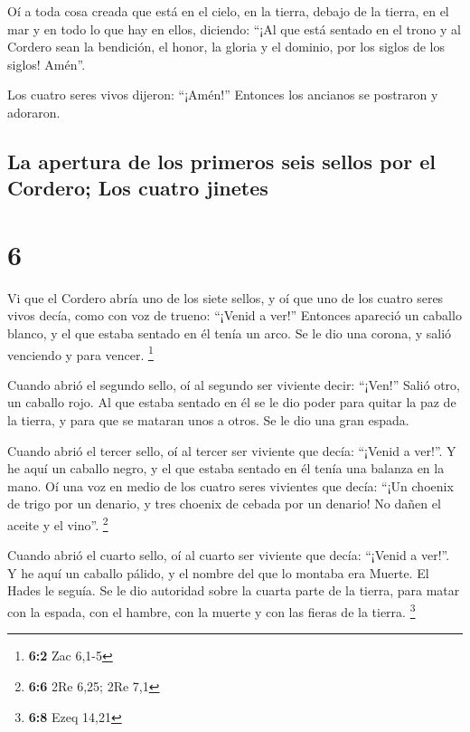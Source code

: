 Oí a toda cosa creada que está en el cielo, en la
tierra, debajo de la tierra, en el mar y en todo lo que hay en ellos,
diciendo: ``¡Al que está sentado en el trono y al Cordero sean la
bendición, el honor, la gloria y el dominio, por los siglos de los
siglos! Amén''.

 Los cuatro seres vivos dijeron: ``¡Amén!'' Entonces los
ancianos se postraron y adoraron.

\hypertarget{la-apertura-de-los-primeros-seis-sellos-por-el-cordero-los-cuatro-jinetes}{%
\subsection{La apertura de los primeros seis sellos por el Cordero; Los
cuatro
jinetes}\label{la-apertura-de-los-primeros-seis-sellos-por-el-cordero-los-cuatro-jinetes}}

\hypertarget{section-5}{%
\section{6}\label{section-5}}

 Vi que el Cordero abría uno de los siete sellos, y oí que
uno de los cuatro seres vivos decía, como con voz de trueno: ``¡Venid a
ver!''  Entonces apareció un caballo blanco, y el que
estaba sentado en él tenía un arco. Se le dio una corona, y salió
venciendo y para vencer. \footnote{\textbf{6:2} Zac 6,1-5}

 Cuando abrió el segundo sello, oí al segundo ser viviente
decir: ``¡Ven!''  Salió otro, un caballo rojo. Al que
estaba sentado en él se le dio poder para quitar la paz de la tierra, y
para que se mataran unos a otros. Se le dio una gran espada.

 Cuando abrió el tercer sello, oí al tercer ser viviente
que decía: ``¡Venid a ver!''. Y he aquí un caballo negro, y el que
estaba sentado en él tenía una balanza en la mano.  Oí una
voz en medio de los cuatro seres vivientes que decía: ``¡Un choenix de
trigo por un denario, y tres choenix de cebada por un denario! No dañen
el aceite y el vino''. \footnote{\textbf{6:6} 2Re 6,25; 2Re 7,1}

 Cuando abrió el cuarto sello, oí al cuarto ser viviente
que decía: ``¡Venid a ver!''.  Y he aquí un caballo
pálido, y el nombre del que lo montaba era Muerte. El Hades le seguía.
Se le dio autoridad sobre la cuarta parte de la tierra, para matar con
la espada, con el hambre, con la muerte y con las fieras de la tierra.
\footnote{\textbf{6:8} Ezeq 14,21}

